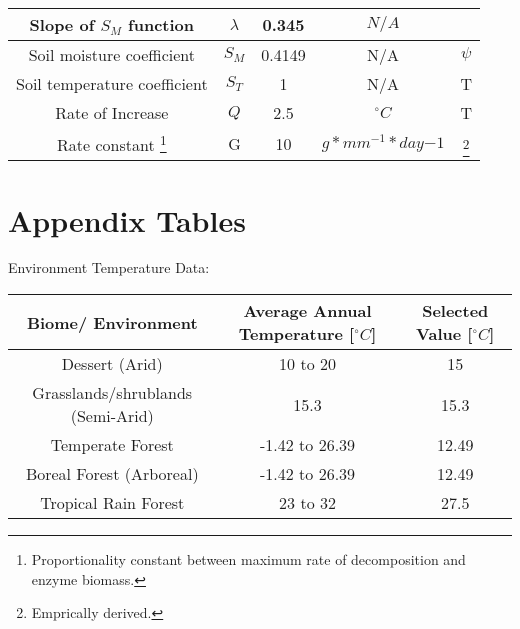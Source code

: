 \documentclass{article}
\begin{document}
\begin{savenotes}
\begin{table}[ht]
\begin{center}
\begin{tabular}{|c c c c c|}
 \hline
 Slope of $S_M$ function & $\lambda$ & 0.345 & $N/A$ &\cite{Moorhead1991}\\ %
 \hline
 Soil moisture coefficient & $S_M$ & 0.4149 & N/A &\cite{Moorhead1991} $\psi$\\ %
 \hline
 Soil temperature coefficient & $S_T$ & 1 & N/A &\cite{Moorhead1991} T\\
 \hline
 Rate of Increase & $Q$ & 2.5 & $^{\circ}C$ &\cite{Moorhead1991} T\\
 \hline
 Rate constant \footnote{Proportionality constant between maximum rate of decomposition and enzyme biomass.} & G & 10 & $g*mm^{-1}*day{-1}$ &\cite{Lustenhouwer2020}\footnote{Emprically derived.}\\  %
 \hline
\end{tabular}
\end{center}
\end{table}
\end{savenotes}


\section{Appendix Tables}

Environment Temperature Data:
\begin{table}[H]
\begin{center}
 \begin{tabular}{|c c c|} 
 \hline
 Biome/ Environment & Average Annual Temperature [$^{\circ}C$] & Selected Value [$^{\circ}C$]\\ [0.5ex] 
 \hline\hline
 Dessert (Arid) & 10 to 20 \cite{Davey2007} & 15 \\ 
 \hline
 Grasslands/shrublands (Semi-Arid) & 15.3 \cite{Pelaez1992} & 15.3 \\
 \hline
 Temperate Forest & -1.42 to 26.39 \cite{Zaz2018} & 12.49 \\
 \hline
 Boreal Forest (Arboreal)& -1.42 to 26.39 \cite{Zaz2018} & 12.49 \\
 \hline
 Tropical Rain Forest & 23 to 32 \cite{Paton2020} &27.5 \\
 \hline
\end{tabular}
\end{center}
\end{table}

 
\end{document}
